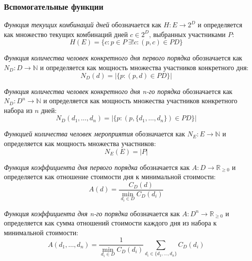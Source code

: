 \subsubsection{Вспомогательные функции}

\textit{Функция текущих комбинаций дней} обозначается как $H: E \rightarrow 2^D$ и определяется как множество текущих комбинаций дней $c \in 2^D$, выбранных участниками $P$:
\begin{equation}
	H(E) = \{c: p \in P \ \exists! c: (p, c) \in PD\}
\end{equation}

\textit{Функция количества человек конкретного дня первого порядка} обозначается как $N_D: D \rightarrow \mathbb{N}$ и определяется как мощность множества участников конкретного дня:
\begin{equation}
	N_D(d) = |\{p: (p, d) \in PD\}|
\end{equation}

\textit{Функция количества человек конкретного дня n-го порядка} обозначается как $N_D: D^n \rightarrow \mathbb{N}$ и определяется как мощность множества участников конкретного набора из $n$ дней:
\begin{equation}
	N_D(d_1, \dots, d_n) = |\{p: (p, \{d_1, \dots, d_n\}) \in PD\}|
\end{equation}

\textit{Функцией количества человек мероприятия} обозначается как \newline $N_E: E \rightarrow \mathbb{N}$ и определяется как мощность множества участников:
\begin{equation}
	N_E(E) = |P|
\end{equation}

\textit{Функция коэффициента дня первого порядка} обозначается как \newline $A: D \rightarrow \mathbb{R}_{\ge 0}$ и определяется как отношение стоимости дня к минимальной стоимости:
\begin{equation}
	A(d) = \frac{C_D(d)}{\min_{d_i \in D}{C_D(d_i)}}
\end{equation}

\textit{Функция коэффициента дня n-го порядка} обозначается как \newline $A: D^n \rightarrow \mathbb{R}_{\ge 0}$ и определяется как сумма отношений стоимости каждого дня из набора к минимальной стоимости:
\begin{equation}
	A(d_1, \dots, d_n) = \frac{1}{\min_{d_i \in D}{C_D(d_i)}}\sum_{d_i \in \{d_1, \dots, d_n\}}{C_D(d_i)}
\end{equation}

